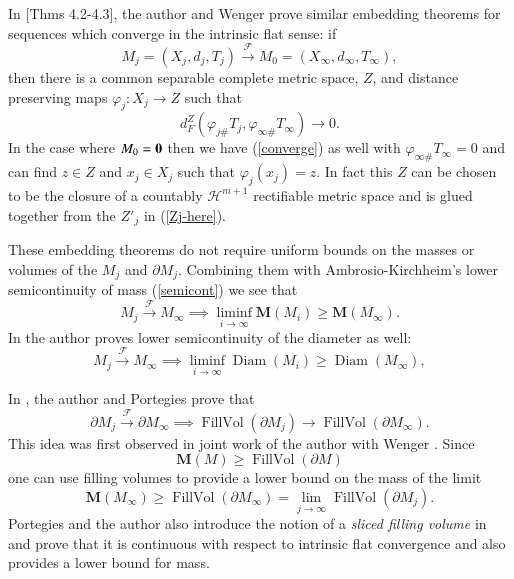 \documentclass[12pt]{amsart}
\begin{document}
In \cite{SorWen2}[Thms 4.2-4.3], the author and Wenger prove similar
embedding theorems for sequences which converge in the intrinsic flat sense:
if 
\begin{equation}
M_{j}=\left(X_j, d_j, T_j\right) {\stackrel {\mathcal{F}}{\longrightarrow} } M_0=\left(X_\infty,d_\infty,T_\infty\right),
\end{equation} 
then
there is a common separable
complete metric space, $Z$, and distance preserving maps  $\varphi_j: X_j \to Z$ such that
\begin{equation}\label{converge}
d_F^Z(\varphi_{j\#}T_j,\varphi_{\infty\#} T_\infty)\to 0.
\end{equation}
In the case where $M_0=\bf{0}$ then we have (\ref{converge})
as well with $\varphi_{\infty\#} T_\infty=0$ and can find $z\in Z$
and $x_j \in X_j$ such that $\varphi_j(x_j)=z$.   In fact this $Z$ can be chosen
to be the closure of a countably $\mathcal{H}^{m+1}$ rectifiable metric space and is
glued together from the $Z'_j$ in (\ref{Zj-here}).

These embedding theorems
 do not
 require uniform bounds on the masses or volumes of the $M_j$ and $\partial M_j$.
 Combining them with Ambrosio-Kirchheim's lower semicontinuity
 of mass (\ref{semicont}) we see that
 \begin{equation} \label{semi-mass}
M_j {\stackrel {\mathcal{F}}{\longrightarrow} } M_\infty \implies \liminf_{i\to\infty} {{\mathbf M}}(M_i) \ge {{\mathbf M}}(M_\infty).
 \end{equation}
In \cite{Sormani-AA} the author proves lower semicontinuity of the
diameter as well:
\begin{equation} \label{semi-diam}
M_j {\stackrel {\mathcal{F}}{\longrightarrow} } M_\infty \implies \liminf_{i\to\infty} {\operatorname{Diam}}(M_i) \ge {\operatorname{Diam}}(M_\infty),
 \end{equation}
 
In \cite{Sormani-properties}, the author and Portegies prove
that
\begin{equation} \label{fillvol-cont}
\partial M_j {\stackrel {\mathcal{F}}{\longrightarrow} } \partial M_\infty \implies {\operatorname{FillVol}}(\partial M_j) \to {\operatorname{FillVol}}(\partial M_\infty).
\end{equation}
This idea was first observed in joint work of the author with Wenger \cite{SorWen1}.
Since
\begin{equation}
{{\mathbf M}}(M) \ge {\operatorname{FillVol}}(\partial M)
\end{equation}
one can use filling volumes to provide a lower bound on the 
mass of the limit
\begin{equation}
{{\mathbf M}}(M_\infty) \ge {\operatorname{FillVol}}(\partial M_\infty) =\lim_{j\to \infty} {\operatorname{FillVol}}(\partial M_j).
\end{equation}
 Portegies and the author also introduce the notion of a {\em sliced filling
 volume} in \cite{Sormani-properties} and prove that it is continuous
 with respect to intrinsic flat convergence and also provides a
 lower bound for mass.
 
\end{document}

